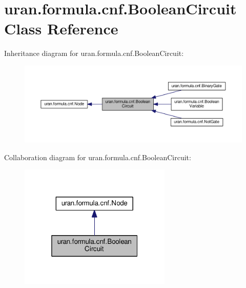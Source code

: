 \hypertarget{classuran_1_1formula_1_1cnf_1_1_boolean_circuit}{}\section{uran.\+formula.\+cnf.\+Boolean\+Circuit Class Reference}
\label{classuran_1_1formula_1_1cnf_1_1_boolean_circuit}


Inheritance diagram for uran.\+formula.\+cnf.\+Boolean\+Circuit\+:
\nopagebreak
\begin{figure}[H]
\begin{center}
\leavevmode
\includegraphics[width=350pt]{classuran_1_1formula_1_1cnf_1_1_boolean_circuit__inherit__graph}
\end{center}
\end{figure}


Collaboration diagram for uran.\+formula.\+cnf.\+Boolean\+Circuit\+:
\nopagebreak
\begin{figure}[H]
\begin{center}
\leavevmode
\includegraphics[width=205pt]{classuran_1_1formula_1_1cnf_1_1_boolean_circuit__coll__graph}
\end{center}
\end{figure}
